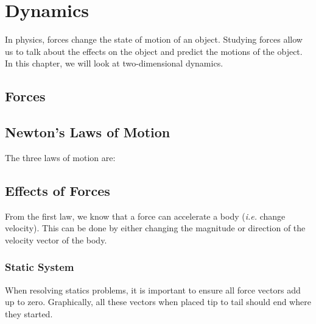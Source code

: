 \documentclass[../main.tex]{subfiles}
\begin{document}
	\section{Dynamics}
		\begin{preamb}
			In physics, forces change the state of motion of an object. Studying forces allow us to talk about the effects on the object and predict the motions of the object. In this chapter, we will look at two-dimensional dynamics.                         
		\end{preamb}
	
		\subsection{Forces}
		
		\subsection{Newton's Laws of Motion}
		The three laws of motion are:
		
		\subsection{Effects of Forces}
		From the first law, we know that a force can accelerate a body (\textit{i.e.} change velocity). This can be done by either changing the magnitude or direction of the velocity vector of the body.
			
		\subsubsection{Static System}
			
		When resolving statics problems, it is important to ensure all force vectors add up to zero. Graphically, all these vectors when placed tip to tail should end where they started.
			
\end{document}
